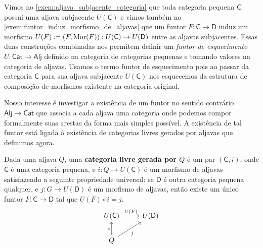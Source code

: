 \begin{exem}\label{exem:funtor_esquecimento_cat_aljava}
    Vimos no \cref{exem:aljava_subjacente_categoria} que toda categoria pequena $\mathsf{C}$ possui uma aljava subjacente $U(\mathsf{C})$ e vimos também no \cref{exem:funtor_induz_morfismo_de_aljavas} que um funtor $F: \mathsf{C} \to \mathsf{D}$ induz um morfismo $U(F) \coloneqq (F,\mathrm{Mor}(F)): U(\mathsf{C}) \to U(\mathsf{D})$ entre as aljavas subjacentes.
    Essas duas construções combinadas nos permitem definir um \emph{funtor de esquecimento} $U: \mathsf{Cat} \to \mathsf{Alj}$ definido na categoria de categorias pequenas e tomando valores na categoria de aljavas.
    Usamos o termo funtor de esquecimento pois ao passar da categoria $\mathsf{C}$ para sua aljava subjacente $U(\mathsf{C})$ nos esquecemos da estrutura de composição de morfismos existente na categoria original.
\end{exem}

Nosso interesse é investigar a existência de um funtor no sentido contrário $\mathsf{Alj} \to \mathsf{Cat}$ que associa a cada aljava uma categoria onde podemos compor formalmente suas arestas da forma mais simples possível.
A existência de tal funtor está ligada à existência de categorias livres gerados por aljavas que definimos agora.

\begin{defin}\label{defin:categoria_livre}
    Dada uma aljava $Q$, uma \textbf{categoria livre gerada por $Q$} é um par $(\mathsf{C},i)$, onde $\mathsf{C}$ é uma categoria pequena, e $i: Q \to U(\mathsf{C})$ é um morfismo de aljavas satisfazendo a seguinte propriedade universal: se $\mathsf{D}$ é outra categoria pequena qualquer, e $j: G \to U(\mathsf{D})$ é um morfismo de aljavas, então existe um único funtor $F: \mathsf{C} \to \mathsf{D}$ tal que $U(F) \circ i = j$.
    \begin{displaymath}
        \begin{tikzcd}
            U(\mathsf{C})
            \arrow[r, dashed, "U(F)"]
            & U(\mathsf{D})
            \\ Q
            \arrow[u, "i"]
            \arrow[ru, "j" swap]
        \end{tikzcd}
    \end{displaymath}
\end{defin}


